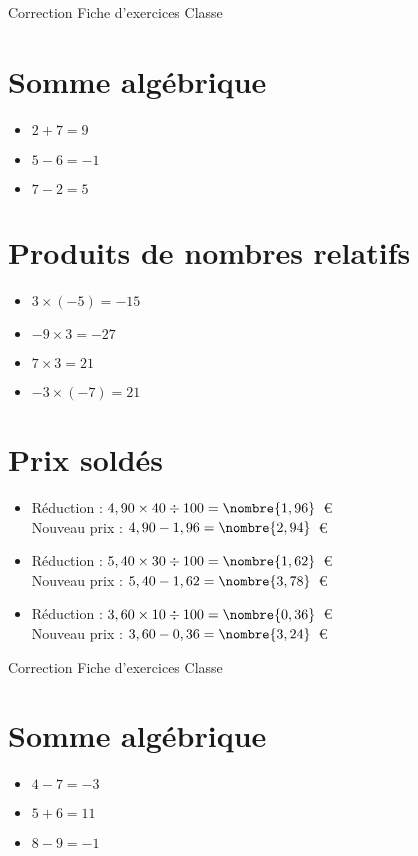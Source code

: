 \documentclass[a4paper,11pt,fleqn]{article}
\begin{document}
\pagestyle{empty}


{Correction} \hfill {\huge Fiche d'exercices } \hfill {Classe}

\section{Somme algébrique}
\begin{itemize}

  \item $2 +7=9$
  \item $5 -6=-1$
  \item $7 -2=5$
\end{itemize}

\section{Produits de nombres relatifs}
\begin{itemize}

  \item $3\times(-5)=-15$
  \item $-9\times3=-27$
  \item $7\times3=21$
  \item $-3\times(-7)=21$
\end{itemize}

\section{Prix soldés}
\begin{itemize}

  \item Réduction : $4,90\times40\div100=\nombre{1,96}$~€\\
  Nouveau prix : $4,90-1,96=\nombre{2,94}$~€
  \item Réduction : $5,40\times30\div100=\nombre{1,62}$~€\\
  Nouveau prix : $5,40-1,62=\nombre{3,78}$~€
  \item Réduction : $3,60\times10\div100=\nombre{0,36}$~€\\
  Nouveau prix : $3,60-0,36=\nombre{3,24}$~€
\end{itemize}
\newpage
\setcounter{exo}{0}
\setcounter{section}{0}
{Correction} \hfill {\huge Fiche d'exercices } \hfill {Classe}

\section{Somme algébrique}
\begin{itemize}

  \item $4 -7=-3$
  \item $5 +6=11$
  \item $8 -9=-1$
\end{itemize}
\end{document}
